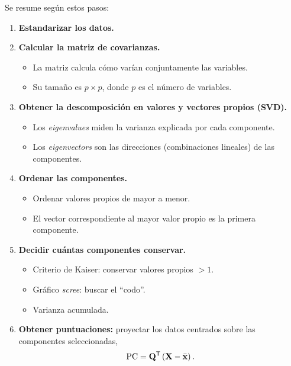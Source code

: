 Se resume seg\'un estos pasos:
\begin{enumerate}
  \item \textbf{Estandarizar los datos.}
  \item \textbf{Calcular la matriz de covarianzas.}
    \begin{itemize}
      \item La matriz calcula c\'omo var\'ian conjuntamente las variables.
      \item Su tama\~no es $p\times p$, donde $p$ es el n\'umero de variables.
    \end{itemize}
  \item \textbf{Obtener la descomposici\'on en valores y vectores propios
        (SVD).}
    \begin{itemize}
      \item Los \emph{eigenvalues} miden la varianza explicada por cada
            componente.
      \item Los \emph{eigenvectors} son las direcciones (combinaciones
            lineales) de las componentes.
    \end{itemize}
  \item \textbf{Ordenar las componentes.}
    \begin{itemize}
      \item Ordenar valores propios de mayor a menor.
      \item El vector correspondiente al mayor valor propio es la primera
            componente.
    \end{itemize}
  \item \textbf{Decidir cu\'antas componentes conservar.}
    \begin{itemize}
      \item Criterio de Kaiser: conservar valores propios $>1$.
      \item Gr\'afico \emph{scree}: buscar el ``codo''.
      \item Varianza acumulada.
    \end{itemize}
  \item \textbf{Obtener puntuaciones:} proyectar los datos centrados sobre las
        componentes seleccionadas,
        \begin{equation}
          \label{eq:puntuaciones_es}
          \mathrm{PC}=\mathbf{Q}^{\mathsf{T}}\left( \mathbf{X}-\bar{\mathbf{x}} \right).
        \end{equation}
\end{enumerate}
